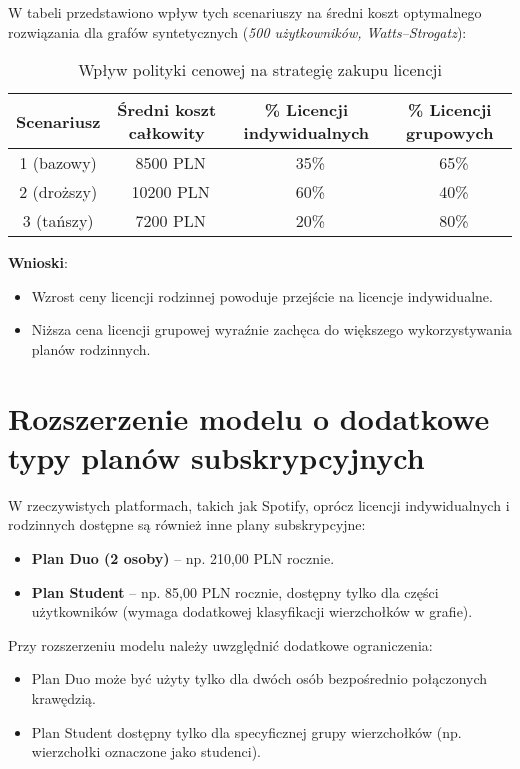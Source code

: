 W tabeli przedstawiono wpływ tych scenariuszy na średni koszt optymalnego rozwiązania dla grafów syntetycznych (\textit{500 użytkowników, Watts–Strogatz}):

\begin{table}[h]
\centering
\begin{tabular}{|c|c|c|c|}
\hline
\textbf{Scenariusz} & \textbf{Średni koszt całkowity} & \textbf{\% Licencji indywidualnych} & \textbf{\% Licencji grupowych} \\
\hline
1 (bazowy) & ~8500 PLN  & ~35\%  & ~65\%  \\
2 (droższy) & ~10200 PLN  & ~60\%  & ~40\%  \\
3 (tańszy) & ~7200 PLN  & ~20\%  & ~80\%  \\
\hline
\end{tabular}
\caption{Wpływ polityki cenowej na strategię zakupu licencji}
\label{tab:pricing_impact}
\end{table}

\textbf{Wnioski}:
\begin{itemize}
    \item Wzrost ceny licencji rodzinnej powoduje przejście na licencje indywidualne.
    \item Niższa cena licencji grupowej wyraźnie zachęca do większego wykorzystywania planów rodzinnych.
\end{itemize}

\section{Rozszerzenie modelu o dodatkowe typy planów subskrypcyjnych}

W rzeczywistych platformach, takich jak Spotify, oprócz licencji indywidualnych i rodzinnych dostępne są również inne plany subskrypcyjne:

\begin{itemize}
    \item \textbf{Plan Duo (2 osoby)} – np. 210,00 PLN rocznie.
    \item \textbf{Plan Student} – np. 85,00 PLN rocznie, dostępny tylko dla części użytkowników (wymaga dodatkowej klasyfikacji wierzchołków w grafie).
\end{itemize}

Przy rozszerzeniu modelu należy uwzględnić dodatkowe ograniczenia:

\begin{itemize}
    \item Plan Duo może być użyty tylko dla dwóch osób bezpośrednio połączonych krawędzią.
    \item Plan Student dostępny tylko dla specyficznej grupy wierzchołków (np. wierzchołki oznaczone jako studenci).
\end{itemize}

